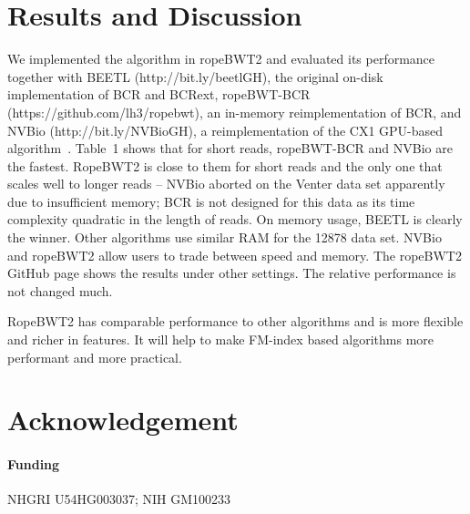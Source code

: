 \documentclass{bioinfo}
\begin{document}
\vspace*{-1em}
\section{Results and Discussion}
We implemented the algorithm in ropeBWT2 and evaluated its performance
together with BEETL (http://bit.ly/beetlGH), the original on-disk
implementation of BCR and BCRext, ropeBWT-BCR (https://github.com/lh3/ropebwt),
an in-memory reimplementation of BCR, and NVBio (http://bit.ly/NVBioGH), a
reimplementation of the CX1 GPU-based algorithm~\citep{DBLP:journals/corr/LiuLL14}.
Table~1 shows that for short reads, ropeBWT-BCR and NVBio are the fastest.
RopeBWT2 is close to them for short reads and the only one that scales well to
longer reads -- NVBio aborted on the Venter data set apparently due to
insufficient memory; BCR is not designed for this data as its time complexity
quadratic in the length of reads. On memory usage, BEETL is clearly the winner.
Other algorithms use similar RAM for the 12878 data set. NVBio and ropeBWT2
allow users to trade between speed and memory. The ropeBWT2 GitHub page shows
the results under other settings.  The relative performance is not changed
much.

RopeBWT2 has comparable performance to other algorithms and is more flexible
and richer in features. It will help to make FM-index based algorithms more
performant and more practical.
\vspace*{-1em}
\section*{Acknowledgement}
\paragraph{Funding\textcolon} NHGRI U54HG003037; NIH GM100233


\end{document}
